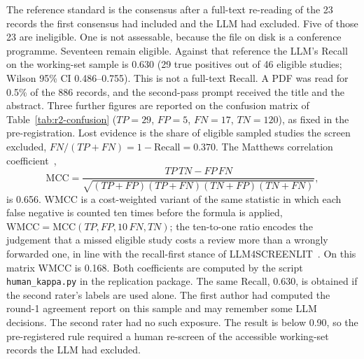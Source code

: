 The reference standard is the consensus after a full-text re-reading of the
23 records the first consensus had included and the LLM had excluded. Five of
those 23 are ineligible. One is not assessable, because the file on disk is
a conference programme. Seventeen remain eligible. Against that reference the
LLM's Recall on the working-set sample is 0.630 (29 true positives out of 46 eligible
studies; Wilson 95\% CI 0.486--0.755). This is not a full-text Recall.
A PDF was read for 0.5\% of the 886 records, and the second-pass prompt
received the title and the abstract. Three further figures are reported
on the confusion matrix of Table~\ref{tab:r2-confusion} ($\mathit{TP}=29$,
$\mathit{FP}=5$, $\mathit{FN}=17$, $\mathit{TN}=120$), as fixed in the pre-registration. Lost
evidence is the share of eligible sampled studies the screen excluded,
$\mathit{FN}/(\mathit{TP}+\mathit{FN}) = 1-\mathrm{Recall} = 0.370$. The Matthews correlation
coefficient~\cite{matthews1975,chicco2020},
{\small
\[
\mathrm{MCC} = \frac{\mathit{TP}\,\mathit{TN} - \mathit{FP}\,\mathit{FN}}
{\sqrt{(\mathit{TP}+\mathit{FP})(\mathit{TP}+\mathit{FN})(\mathit{TN}+\mathit{FP})(\mathit{TN}+\mathit{FN})}},
\]}
is 0.656. WMCC is a cost-weighted variant of the same statistic in which
each false negative is counted ten times before the formula is applied,
$\mathrm{WMCC} = \mathrm{MCC}(\mathit{TP}, \mathit{FP}, 10\,\mathit{FN}, \mathit{TN})$; the ten-to-one
ratio encodes the judgement that a missed eligible study costs a review
more than a wrongly forwarded one, in line with the recall-first stance
of LLM4SCREENLIT~\cite{llm4screenlit2025}. On this matrix WMCC is 0.168.
Both coefficients are computed by the script \texttt{human\_kappa.py}
in the replication package. The same Recall, 0.630, is obtained if the
second rater's labels are used alone. The first author had computed the
round-1 agreement report on this sample and may remember some LLM decisions.
The second rater had no such exposure. The result is below 0.90, so the
pre-registered rule required a human re-screen of the accessible working-set
records the LLM had excluded.

